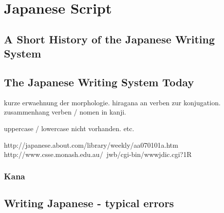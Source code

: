
\chapter{Japanese Script}
\label{sec:japansescript}


\section{A Short History of the Japanese Writing System}
\label{sec:ahorthistoryofjapanesewritingsystem}

\section{The Japanese Writing System Today}
\label{sec:japanesewritingsystemtoday}

kurze erwaehnung der morphologie. hiragana an verben zur konjugation.
zusammenhang verben / nomen in kanji.

uppercase / lowercase nicht vorhanden. etc.

http://japanese.about.com/library/weekly/aa070101a.htm
http://www.csse.monash.edu.au/~jwb/cgi-bin/wwwjdic.cgi?1R

\subsection{Kana}
\label{sec:kana}

\section{Writing Japanese - typical errors}
\label{sec:writingjapanesetypicalerrors}

